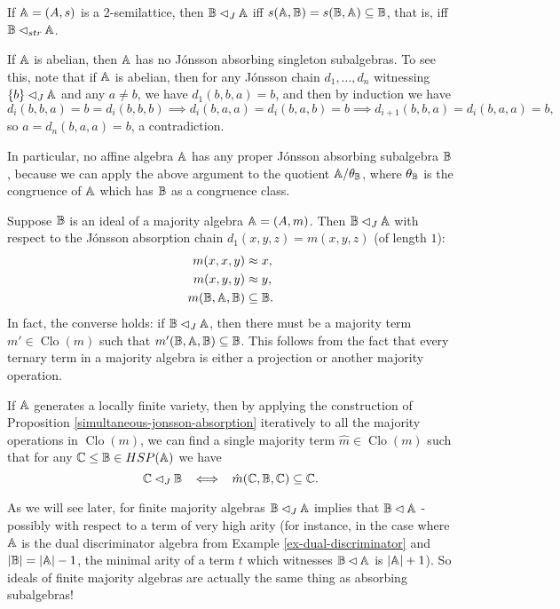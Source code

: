 \documentclass[letterpaper,11pt]{article}
\DeclareMathOperator{\Clo}{Clo}
\begin{document}
\begin{ex} If $\mathbb{A} = (A,s)$ is a 2-semilattice, then $\mathbb{B} \lhd_J \mathbb{A}$ iff $s(\mathbb{A},\mathbb{B}) = s(\mathbb{B},\mathbb{A}) \subseteq \mathbb{B}$, that is, iff $\mathbb{B} \lhd_{str} \mathbb{A}$.
\end{ex}

\begin{ex} If $\mathbb{A}$ is abelian, then $\mathbb{A}$ has no J\'onsson absorbing singleton subalgebras. To see this, note that if $\mathbb{A}$ is abelian, then for any J\'onsson chain $d_1, ..., d_n$ witnessing $\{b\} \lhd_J \mathbb{A}$ and any $a \ne b$, we have $d_1(b,b,a) = b$, and then by induction we have
\[
d_i(b,\boxed{b},a) = b = d_i(b,\boxed{b},b) \implies d_i(b,\boxed{a},a) = d_i(b,\boxed{a},b) = b \implies d_{i+1}(b,b,a) = d_i(b,a,a) = b,
\]
so $a = d_n(b,a,a) = b$, a contradiction.

In particular, no affine algebra $\mathbb{A}$ has any proper J\'onsson absorbing subalgebra $\mathbb{B}$, because we can apply the above argument to the quotient $\mathbb{A}/\theta_{\mathbb{B}}$, where $\theta_{\mathbb{B}}$ is the congruence of $\mathbb{A}$ which has $\mathbb{B}$ as a congruence class.
\end{ex}

\begin{ex} Suppose $\mathbb{B}$ is an ideal of a majority algebra $\mathbb{A} = (A,m)$. Then $\mathbb{B} \lhd_J \mathbb{A}$ with respect to the J\'onsson absorption chain $d_1(x,y,z) = m(x,y,z)$ (of length $1$):
\begin{align*}
m(x,x,y) &\approx x,\\
m(x,y,y) &\approx y,\\
m(\mathbb{B},\mathbb{A},\mathbb{B}) &\subseteq \mathbb{B}.
\end{align*}
In fact, the converse holds: if $\mathbb{B} \lhd_J \mathbb{A}$, then there must be a majority term $m' \in \Clo(m)$ such that $m'(\mathbb{B},\mathbb{A},\mathbb{B}) \subseteq \mathbb{B}$. This follows from the fact that every ternary term in a majority algebra is either a projection or another majority operation.

If $\mathbb{A}$ generates a locally finite variety, then by applying the construction of Proposition \ref{simultaneous-jonsson-absorption} iteratively to all the majority operations in $\Clo(m)$, we can find a single majority term $\hat{m} \in \Clo(m)$ such that for any $\mathbb{C} \le \mathbb{B} \in HSP(\mathbb{A})$ we have
\[
\mathbb{C} \lhd_J \mathbb{B} \;\; \iff \;\; \hat{m}(\mathbb{C},\mathbb{B},\mathbb{C}) \subseteq \mathbb{C}.
\]

As we will see later, for finite majority algebras $\mathbb{B} \lhd_J \mathbb{A}$ implies that $\mathbb{B} \lhd \mathbb{A}$ - possibly with respect to a term of very high arity (for instance, in the case where $\mathbb{A}$ is the dual discriminator algebra from Example \ref{ex-dual-discriminator} and $|\mathbb{B}| = |\mathbb{A}|-1$, the minimal arity of a term $t$ which witnesses $\mathbb{B} \lhd \mathbb{A}$ is $|\mathbb{A}| + 1$). So ideals of finite majority algebras are actually the same thing as absorbing subalgebras!
\end{ex}
\end{document}
